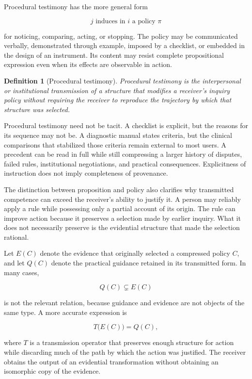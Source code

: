 \documentclass[11pt]{article}
\newtheorem{definition}[proposition]{Definition}
\begin{document}
Procedural testimony has the more general form

\[
j \text{ induces in } i \text{ a policy } \pi
\]

for noticing, comparing, acting, or stopping. The policy may be communicated verbally, demonstrated through example, imposed by a checklist, or embedded in the design of an instrument. Its content may resist complete propositional expression even when its effects are observable in action.

\begin{definition}[Procedural testimony]
Procedural testimony is the interpersonal or institutional transmission of a structure that modifies a receiver's inquiry policy without requiring the receiver to reproduce the trajectory by which that structure was selected.
\end{definition}

Procedural testimony need not be tacit. A checklist is explicit, but the reasons for its sequence may not be. A diagnostic manual states criteria, but the clinical comparisons that stabilized those criteria remain external to most users. A precedent can be read in full while still compressing a larger history of disputes, failed rules, institutional negotiations, and practical consequences. Explicitness of instruction does not imply completeness of provenance.

The distinction between proposition and policy also clarifies why transmitted competence can exceed the receiver's ability to justify it. A person may reliably apply a rule while possessing only a partial account of its origin. The rule can improve action because it preserves a selection made by earlier inquiry. What it does not necessarily preserve is the evidential structure that made the selection rational.

Let $E(C)$ denote the evidence that originally selected a compressed policy $C$, and let $Q(C)$ denote the practical guidance retained in its transmitted form. In many cases,

\[
Q(C) \subsetneq E(C)
\]

is not the relevant relation, because guidance and evidence are not objects of the same type. A more accurate expression is

\[
T\bigl(E(C)\bigr)=Q(C),
\]

where $T$ is a transmission operator that preserves enough structure for action while discarding much of the path by which the action was justified. The receiver obtains the output of an evidential transformation without obtaining an isomorphic copy of the evidence.
\end{document}
